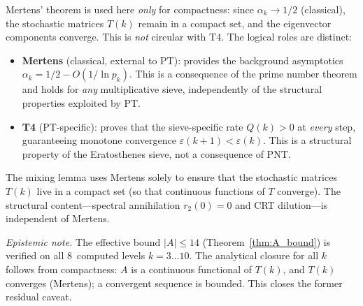 \documentclass[12pt,a4paper]{article}
\begin{document}
\begin{remark}
\label{rem:mertens_role}
Mertens' theorem is used here \emph{only} for compactness: since
$\alpha_k \to 1/2$ (classical), the stochastic matrices $T(k)$ remain
in a compact set, and the eigenvector components converge.  This is
\emph{not} circular with T4.  The logical roles are distinct:
\begin{itemize}[nosep]
\item \textbf{Mertens} (classical, external to PT): provides the
  background asymptotics $\alpha_k = 1/2 - O(1/\ln p_k)$. This is a
  consequence of the prime number theorem and holds for \emph{any}
  multiplicative sieve, independently of the structural properties
  exploited by PT.
\item \textbf{T4} (PT-specific): proves that the sieve-specific
  rate $Q(k) > 0$ at \emph{every} step, guaranteeing monotone
  convergence $\varepsilon(k+1) < \varepsilon(k)$. This is a structural
  property of the Eratosthenes sieve, not a consequence of PNT.
\end{itemize}
The mixing lemma uses Mertens solely to ensure that the stochastic
matrices $T(k)$ live in a compact set (so that continuous functions of
$T$ converge). The structural content---spectral annihilation
$r_2(0) = 0$ and CRT dilution---is independent of Mertens.

\emph{Epistemic note.} The effective bound $|A| \leq 14$
(Theorem~\ref{thm:A_bound}) is verified on all $8$~computed levels
$k = 3\ldots 10$. The analytical closure for all $k$ follows from
compactness: $A$ is a continuous functional of $T(k)$, and $T(k)$
converges (Mertens); a convergent sequence is bounded.  This closes
the former residual caveat.
\end{remark}
\end{document}
